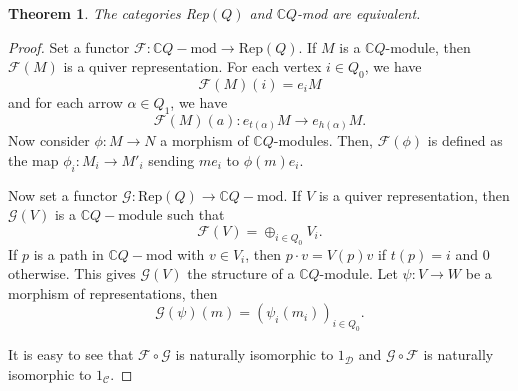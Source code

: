 \documentclass[10pt,a4paper]{report}
\newtheorem*{thm}{Theorem}
\begin{document}
\begin{thm}
The categories Rep$(Q)$ and $\mathbb{C}Q$-mod are equivalent.
\end{thm}
\begin{proof}
	Set a functor $\mathcal{F}:\mathbb{C}Q-\mathrm{mod}\to \mathrm{Rep}(Q)$. If $M$ is a $\mathbb{C}Q$-module, then $\mathcal{F}(M)$ is a quiver representation. For each vertex $i\in Q_{0}$, we have 
	\[
		\mathcal{F}(M)(i)=e_{i}M
	\]
and for each arrow $\alpha\in Q_{1}$, we have
	\[
		\mathcal{F}(M)(a):e_{t(\alpha)}M\to e_{h(\alpha)}M.
	\]
Now consider $\phi:M\to N$ a morphism of $\mathbb{C}Q$-modules. Then, $\mathcal{F}(\phi)$ is defined as the map $\phi_{i}:M_{i}\to M'_{i}$ sending $me_{i}$ to $\phi(m)e_{i}$. 

	Now set a functor $\mathcal{G}:\mathrm{Rep}(Q)\to\mathbb{C}Q-\mathrm{mod}$. If $V$ is a quiver representation, then $\mathcal{G}(V)$ is a $\mathbb{C}Q-\mathrm{module}$ such that 
	\[
		\mathcal{F}(V)=\oplus_{i\in Q_{0}}V_{i}.
	\]
If $p$ is a path in $\mathbb{C}Q-\mathrm{mod}$ with $v\in V_{i}$, then $p\cdot v = V(p)v$ if $t(p)=i$ and 0 otherwise. This gives $\mathcal{G}(V)$ the structure of a $\mathbb{C}Q$-module. Let $\psi: V\to W$ be a morphism of representations, then
	\[
		\mathcal{G}(\psi)(m)=(\psi_{i}(m_{i}))_{i\in Q_{0}}.
	\]

	It is easy to see that $\mathcal{F}\circ\mathcal{G}$ is naturally isomorphic to $1_{\mathcal{D}}$ and $\mathcal{G}\circ\mathcal{F}$ is naturally isomorphic to $1_{\mathcal{C}}$.
\end{proof}
\end{document}
